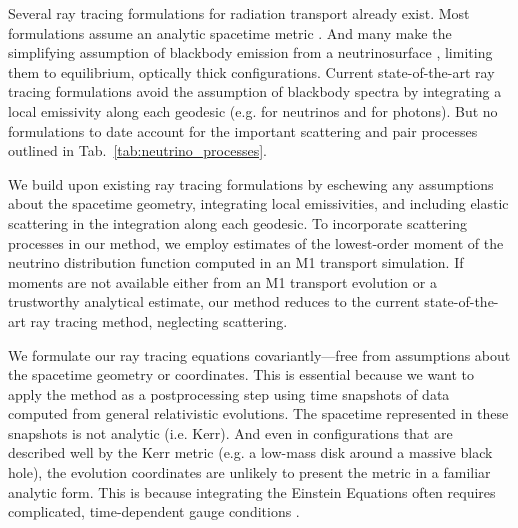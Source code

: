 \documentclass[aps,floatfix,prd,superscriptaddress,twocolumn]{revtex4-1}
\begin{document}
Several ray tracing formulations for radiation transport already exist.
Most formulations assume an analytic spacetime metric
\citep{birk2007-nunubar, hari2010-gr_nunubar_collapsar, kova2011-gr_ray_tracing}.
And many make the simplifying assumption of blackbody emission from a
neutrinosurface \citep{birk2007-nunubar, kova2011-gr_ray_tracing},
limiting them to equilibrium, optically thick configurations.
Current state-of-the-art ray tracing formulations avoid the assumption of
blackbody spectra by integrating a local emissivity along each geodesic
(e.g. \cite{hari2010-gr_nunubar_collapsar} for neutrinos and
\cite{youn2012-gr_radiative_transfer} for photons).
But no formulations to date account for the important scattering and pair
processes outlined in Tab.~\ref{tab:neutrino_processes}.

We build upon existing ray tracing formulations
by eschewing any assumptions about the spacetime geometry,
integrating local emissivities,
and including elastic scattering in the integration along each geodesic.
To incorporate scattering processes in our method, we employ estimates of the
lowest-order moment of the neutrino distribution function
computed in an M1 transport simulation.
If moments are not available either from
an M1 transport evolution or a trustworthy analytical estimate,
our method reduces to the current state-of-the-art ray tracing method,
neglecting scattering.

We formulate our ray tracing equations covariantly---free from
assumptions about the spacetime geometry or coordinates. This is essential
because we want to apply the method as a postprocessing step using
time snapshots of data computed from general relativistic evolutions.
The spacetime represented in these snapshots is not analytic (i.e. Kerr).
And even in configurations that are described well by the Kerr metric
(e.g. a low-mass disk around a massive black hole),
the evolution coordinates are unlikely to present the metric in
a familiar analytic form.
This is because integrating the Einstein Equations often requires complicated,
time-dependent gauge conditions
\citep{lind2007-gen_harmonic, fouc2013-compactness_and_spin}.
\end{document}

